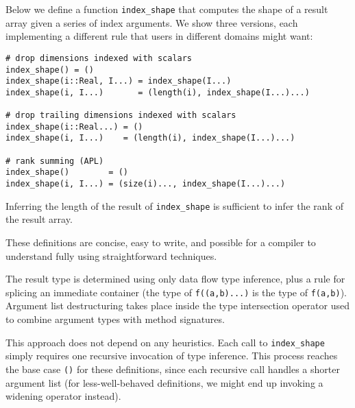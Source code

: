 Below we define a function \texttt{index\_shape} that computes the
shape of a result array given a series of index arguments.
We show three versions, each implementing a different rule that users in
different domains might want:


\vspace{-3ex}
\begin{singlespace}
\begin{verbatim}
# drop dimensions indexed with scalars
index_shape() = ()
index_shape(i::Real, I...) = index_shape(I...)
index_shape(i, I...)       = (length(i), index_shape(I...)...)

# drop trailing dimensions indexed with scalars
index_shape(i::Real...) = ()
index_shape(i, I...)    = (length(i), index_shape(I...)...)

# rank summing (APL)
index_shape()        = ()
index_shape(i, I...) = (size(i)..., index_shape(I...)...)
\end{verbatim}
\end{singlespace}

Inferring the length of the result of \texttt{index\_shape} is sufficient
to infer the rank of the result array.

These definitions are concise, easy to write, and possible for a
compiler to understand fully using straightforward techniques.

The result type is determined using only data flow type inference, plus a
rule for splicing an immediate container (the type of \texttt{f((a,b)...)} is
the type of \texttt{f(a,b)}). Argument list destructuring takes place inside
the type intersection operator used to combine argument types with method
signatures.

This approach does not depend on any heuristics. Each call to \texttt{index\_shape}
simply requires one recursive invocation of type inference. This process reaches
the base case \texttt{()} for these definitions, since each recursive call
handles a shorter argument list (for less-well-behaved definitions, we might
end up invoking a widening operator instead).


